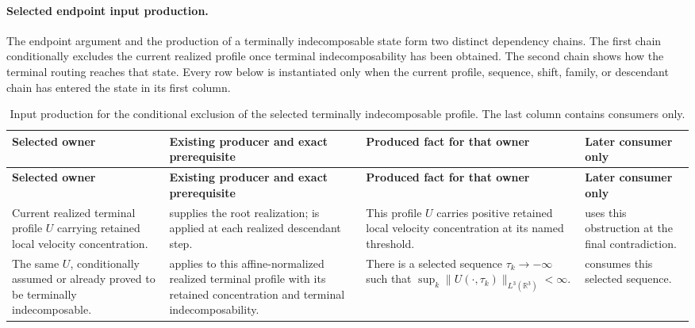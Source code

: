 \documentclass[11pt]{amsart}
\numberwithin{equation}{section}
\theoremstyle{plain}
\theoremstyle{definition}
\theoremstyle{remark}
\newcommand{\R}{\mathbb R}
\begin{document}
\paragraph{Selected endpoint input production.}
The endpoint argument and the production of a terminally indecomposable state
form two distinct dependency chains.  The first chain conditionally excludes
the current realized profile once terminal indecomposability has been obtained.
The second chain shows how the terminal routing reaches that state.  Every row
below is instantiated only when the current profile, sequence, shift, family,
or descendant chain has entered the state in its first column.

\begingroup
\scriptsize
\setlength{\tabcolsep}{2pt}
\renewcommand{\arraystretch}{1.18}
\begin{longtable}{@{}L{0.18\textwidth}L{0.30\textwidth}L{0.27\textwidth}L{0.17\textwidth}@{}}
\caption{Input production for the conditional exclusion of the selected
terminally indecomposable profile.  The last column contains consumers only.}
\label{tab:atomic-endpoint-input-production}\\
\hline
\textbf{Selected owner} & \textbf{Existing producer and exact prerequisite} &
\textbf{Produced fact for that owner} & \textbf{Later consumer only}\\
\hline
\endfirsthead
\hline
\textbf{Selected owner} & \textbf{Existing producer and exact prerequisite} &
\textbf{Produced fact for that owner} & \textbf{Later consumer only}\\
\hline
\endhead
\hline
\endfoot
Current realized terminal profile \(U\) carrying retained local velocity
concentration. &
 supplies the root realization;
 is applied at each realized descendant step. &
This profile \(U\) carries positive retained local velocity concentration at
its named threshold. &
 uses this obstruction at the final
contradiction.\\

The same \(U\), conditionally assumed or already proved to be terminally
indecomposable. &
 applies to this affine-normalized realized
terminal profile with its retained concentration and terminal
indecomposability. &
There is a selected sequence \(\tau_k\to-\infty\) such that
\(\sup_k\|U(\cdot,\tau_k)\|_{L^3(\R^3)}<\infty\). &
 consumes this selected sequence.\\


\end{longtable}
\end{document}
